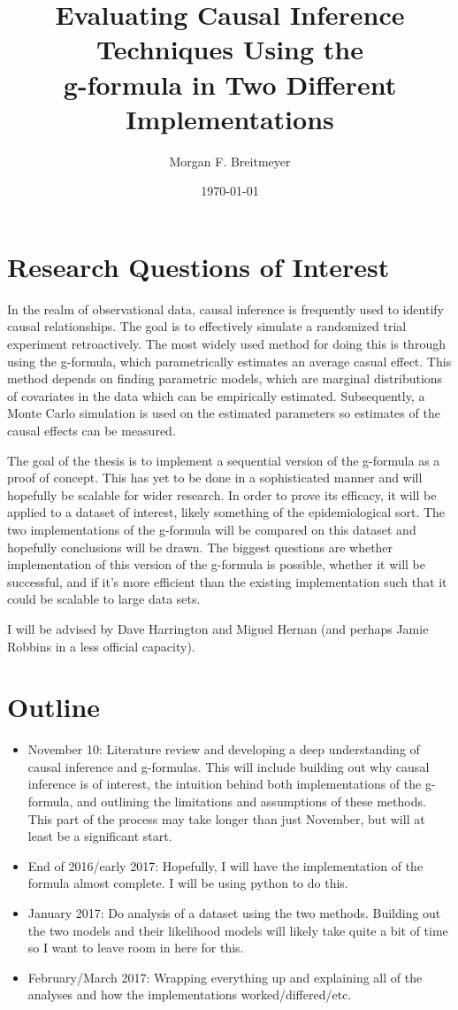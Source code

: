 \documentclass[a4paper]{article}
\title{Evaluating Causal Inference Techniques Using the \\ g-formula in Two Different Implementations }
\author{Morgan F. Breitmeyer}
\date{\today}
\begin{document}
\maketitle

\section{Research Questions of Interest} 
In the realm of observational data, causal inference is frequently used to identify causal relationships.  The goal is to effectively simulate a randomized trial experiment retroactively.  The most widely used method for doing this is through using the g-formula, which parametrically estimates an average casual effect.  This method depends on finding parametric models, which are marginal distributions of covariates in the data which can be empirically estimated.  Subsequently, a Monte Carlo simulation is used on the estimated parameters so estimates of the causal effects can be measured.  

The goal of the thesis is to implement a sequential version of the g-formula as a proof of concept.  This has yet to be done in a sophisticated manner and will hopefully be scalable for wider research.  In order to prove its efficacy, it will be applied to a dataset of interest, likely something of the epidemiological sort.  The two implementations of the g-formula will be compared on this dataset and hopefully conclusions will be drawn.  The biggest questions are whether implementation of this version of the g-formula is possible, whether it will be successful, and if it's more efficient than the existing implementation such that it could be scalable to large data sets.    

I will be advised by Dave Harrington and Miguel Hernan (and perhaps Jamie Robbins in a less official capacity).  

\section{Outline} 
\begin{itemize} 
\item November 10: Literature review and developing a deep understanding of causal inference and g-formulas.  This will include building out why causal inference is of interest, the intuition behind both implementations of the g-formula, and outlining the limitations and assumptions of these methods.  This part of the process may take longer than just November, but will at least be a significant start.  
\item End of 2016/early 2017: Hopefully, I will have the implementation of the formula almost complete.  I will be using python to do this.  
\item January 2017: Do analysis of a dataset using the two methods. Building out the two models and their likelihood models will likely take quite a bit of time so I want to leave room in here for this.  
\item February/March 2017: Wrapping everything up and explaining all of the analyses and how the implementations worked/differed/etc.  
\end{itemize} 

\nocite{*} 

\newpage


\end{document}
